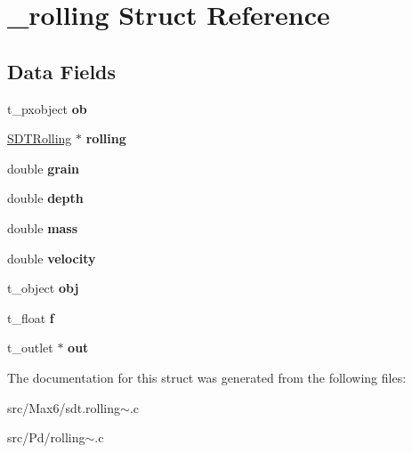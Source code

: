 \hypertarget{struct__rolling}{}\section{\+\_\+rolling Struct Reference}
\label{struct__rolling}
\subsection*{Data Fields}
\begin{DoxyCompactItemize}
\item 
\hypertarget{struct__rolling_a55b4380edb216f04a1c42b9095594963}{}t\+\_\+pxobject {\bfseries ob}\label{struct__rolling_a55b4380edb216f04a1c42b9095594963}

\item 
\hypertarget{struct__rolling_a72afea50d161bcb44d368380c2ea7ea8}{}\hyperlink{struct_s_d_t_rolling}{S\+D\+T\+Rolling} $\ast$ {\bfseries rolling}\label{struct__rolling_a72afea50d161bcb44d368380c2ea7ea8}

\item 
\hypertarget{struct__rolling_a70338fcaf3537644825b356846dc7de8}{}double {\bfseries grain}\label{struct__rolling_a70338fcaf3537644825b356846dc7de8}

\item 
\hypertarget{struct__rolling_a6153a438c3d8d1be934e19e97e58c60c}{}double {\bfseries depth}\label{struct__rolling_a6153a438c3d8d1be934e19e97e58c60c}

\item 
\hypertarget{struct__rolling_a244bf42c46054cf1113be44d55f2156d}{}double {\bfseries mass}\label{struct__rolling_a244bf42c46054cf1113be44d55f2156d}

\item 
\hypertarget{struct__rolling_accacf4e9263030d70ed79f8516c0eac5}{}double {\bfseries velocity}\label{struct__rolling_accacf4e9263030d70ed79f8516c0eac5}

\item 
\hypertarget{struct__rolling_a21775ab6bc98b0961a6e9fd9d832e65b}{}t\+\_\+object {\bfseries obj}\label{struct__rolling_a21775ab6bc98b0961a6e9fd9d832e65b}

\item 
\hypertarget{struct__rolling_a73198eb29c82f0df575e45396b68c18c}{}t\+\_\+float {\bfseries f}\label{struct__rolling_a73198eb29c82f0df575e45396b68c18c}

\item 
\hypertarget{struct__rolling_a07b901a5d7d4140b7f701a94bf7f245c}{}t\+\_\+outlet $\ast$ {\bfseries out}\label{struct__rolling_a07b901a5d7d4140b7f701a94bf7f245c}

\end{DoxyCompactItemize}


The documentation for this struct was generated from the following files\+:\begin{DoxyCompactItemize}
\item 
src/\+Max6/sdt.\+rolling$\sim$.\+c\item 
src/\+Pd/rolling$\sim$.\+c\end{DoxyCompactItemize}
